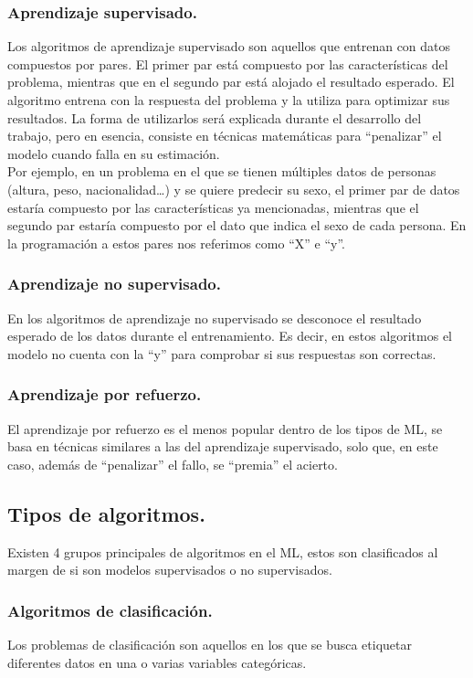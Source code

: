 \documentclass[a4paper,11pt]{article}
\begin{document}
\subsubsection{Aprendizaje supervisado.}
Los algoritmos de aprendizaje supervisado son aquellos que entrenan con datos compuestos por pares. El primer par está compuesto por las características del problema, mientras que en el segundo par está alojado el resultado esperado. El algoritmo entrena con la respuesta del problema y la utiliza para optimizar sus resultados. La forma de utilizarlos será explicada durante el desarrollo del trabajo, pero en esencia, consiste en técnicas matemáticas para “penalizar” el modelo cuando falla en su estimación.\\

\noindent
Por ejemplo, en un problema en el que se tienen múltiples datos de personas (altura, peso, nacionalidad…) y se quiere predecir su sexo, el primer par de datos estaría compuesto por las características ya mencionadas, mientras que el segundo par estaría compuesto por el dato que indica el sexo de cada persona. En la programación a estos pares nos referimos como “X” e “y”.

\subsubsection{Aprendizaje no supervisado.}
En los algoritmos de aprendizaje no supervisado se desconoce el resultado esperado de los datos durante el entrenamiento. Es decir, en estos algoritmos el modelo no cuenta con la “y” para comprobar si sus respuestas son correctas.
\subsubsection{Aprendizaje por refuerzo.}
El aprendizaje por refuerzo es el menos popular dentro de los tipos de ML, se basa en técnicas similares a las del aprendizaje supervisado, solo que, en este caso, además de “penalizar” el fallo, se “premia” el acierto.
\subsection{Tipos de algoritmos.}
Existen 4 grupos principales de algoritmos en el ML, estos son clasificados al margen de si son modelos supervisados o no supervisados.

\subsubsection{Algoritmos de clasificación.}
Los problemas de clasificación son aquellos en los que se busca etiquetar diferentes datos en una o varias variables categóricas. \\
\end{document}
